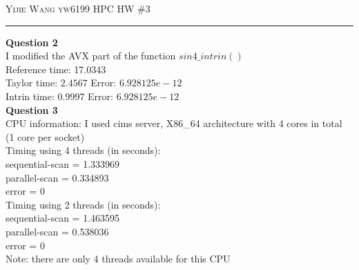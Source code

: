 \documentclass[12pt]{amsart}
\begin{document}
\thispagestyle{empty}

{\scshape Yijie Wang yw6199} \hfill {\scshape \large HPC} \hfill {HW \#3\scshape }
 

\hrule
\smallskip
\vskip0.2cm

\textbf{Question 2} \\
I modified the AVX part of the function $sin4\_intrin()$\\
Reference time: 17.0343\\ 
Taylor time:    $2.4567$ \hspace{1cm} Error: $6.928125e-12$\\
Intrin time:    $0.9997$ \hspace{1cm}     Error: $6.928125e-12$\\
\break
\textbf{Question 3} \\
CPU information: I used cims server, X86\_64 architecture with 4 cores in total (1 core per socket)\\
Timing using 4 threads (in seconds):\\
sequential-scan = 1.333969 \\
parallel-scan   = 0.334893 \\
error = 0\\
\break
Timing using 2 threads (in seconds):\\
sequential-scan = 1.463595\\
parallel-scan   = 0.538036\\
error = 0\\
\break
Note: there are only 4 threads available for this CPU\\
\end{document}
